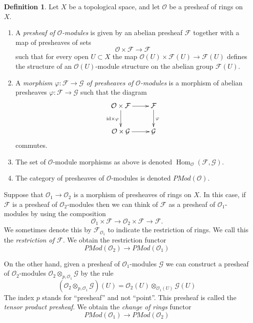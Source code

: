 \documentclass{stacks-project}
\theoremstyle{plain}
\theoremstyle{definition}
\newtheorem{definition}[subsection]{Definition}
\theoremstyle{remark}
\numberwithin{equation}{subsection}
\def\Hom{\mathop{\mathrm{Hom}}\nolimits}
\begin{document}
\begin{definition}
\label{definition-presheaf-modules}
Let $X$ be a topological space, and let $\mathcal{O}$ be
a presheaf of rings on $X$.
\begin{enumerate}
\item A {\it presheaf of $\mathcal{O}$-modules}
is given by an abelian presheaf $\mathcal{F}$ together with a
map of presheaves of sets
$$
\mathcal{O} \times \mathcal{F} \longrightarrow \mathcal{F}
$$
such that for every open $U \subset X$ the map
$\mathcal{O}(U) \times \mathcal{F}(U) \to \mathcal{F}(U)$
defines the structure of an $\mathcal{O}(U)$-module
structure on the abelian group $\mathcal{F}(U)$.
\item A {\it morphism $\varphi : \mathcal{F} \to \mathcal{G}$
of presheaves of $\mathcal{O}$-modules} is a morphism of abelian presheaves
$\varphi : \mathcal{F} \to \mathcal{G}$ such that
the diagram
$$
\xymatrix{
\mathcal{O} \times \mathcal{F} \ar[r] \ar[d]_{\text{id} \times \varphi} &
\mathcal{F} \ar[d]^{\varphi} \\
\mathcal{O} \times \mathcal{G} \ar[r] &
\mathcal{G}
}
$$
commutes.
\item The set of $\mathcal{O}$-module morphisms as above is
denoted $\Hom_\mathcal{O}(\mathcal{F}, \mathcal{G})$.
\item The category of presheaves of $\mathcal{O}$-modules
is denoted $\textit{PMod}(\mathcal{O})$.
\end{enumerate}
\end{definition}

\noindent
Suppose that $\mathcal{O}_1 \to \mathcal{O}_2$ is a
morphism of presheaves of rings on $X$. In this case,
if $\mathcal{F}$ is a presheaf of $\mathcal{O}_2$-modules
then we can think of $\mathcal{F}$ as a presheaf of
$\mathcal{O}_1$-modules by using the composition
$$
\mathcal{O}_1 \times \mathcal{F}
\to
\mathcal{O}_2 \times \mathcal{F}
\to
\mathcal{F}.
$$
We sometimes denote this by $\mathcal{F}_{\mathcal{O}_1}$
to indicate the restriction of rings. We call this
the {\it restriction of $\mathcal{F}$}. We obtain the
restriction functor
$$
\textit{PMod}(\mathcal{O}_2)
\longrightarrow
\textit{PMod}(\mathcal{O}_1)
$$

\medskip\noindent
On the other hand, given a presheaf of $\mathcal{O}_1$-modules
$\mathcal{G}$
we can construct a presheaf of $\mathcal{O}_2$-modules
$\mathcal{O}_2 \otimes_{p, \mathcal{O}_1} \mathcal{G}$
by the rule
$$
\left(\mathcal{O}_2 \otimes_{p, \mathcal{O}_1} \mathcal{G}\right)(U)
=
\mathcal{O}_2(U) \otimes_{\mathcal{O}_1(U)} \mathcal{G}(U)
$$
The index $p$ stands for ``presheaf'' and not ``point''.
This presheaf is called the {\it tensor product presheaf}. We obtain
the {\it change of rings} functor
$$
\textit{PMod}(\mathcal{O}_1)
\longrightarrow
\textit{PMod}(\mathcal{O}_2)
$$
\end{document}
